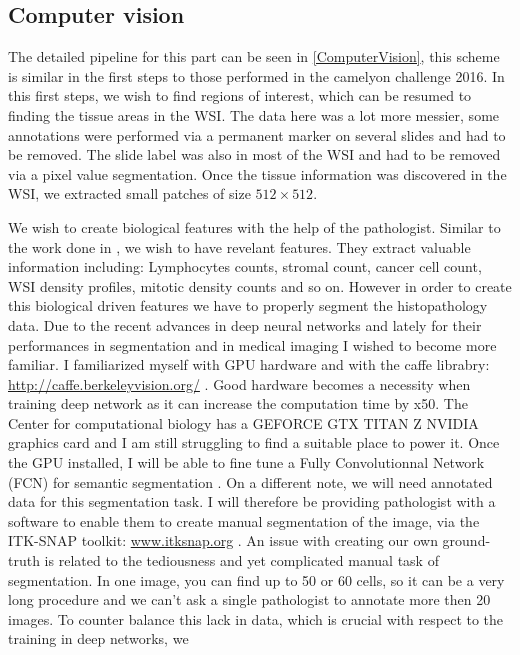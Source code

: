 \documentclass[a4paper,10pt]{article}
\begin{document}
\subsection{Computer vision}
The detailed pipeline for this part can be seen in
\ref{ComputerVision}, this scheme is similar in the first steps to
those performed in the camelyon challenge 2016. In this first steps,
we wish to find regions of interest, which can be resumed to finding
the tissue areas in the WSI. The data here was a lot more messier,
some annotations were performed via a permanent marker on several
slides and had to be removed. The slide label was also in most of the
WSI and had to be removed via a pixel value segmentation. Once the
tissue information was discovered in the WSI, we extracted small
patches of size $512 \times 512$. 

We wish to create biological features with the help of the
pathologist. Similar to the work done in \citet{yuan2012quantitative},
we wish to have revelant features. They extract valuable information
including: Lymphocytes counts, stromal count, cancer cell count, WSI
density profiles, mitotic density counts and so on. However in order
to create this biological driven features we have to properly segment
the histopathology data. Due to the recent advances in deep neural
networks and lately for their performances in segmentation and in
medical imaging \citep{UNet,long2015fcn} I wished to become more
familiar. I familiarized myself with GPU hardware and with the caffe
librabry: \url{http://caffe.berkeleyvision.org/}
\citep{jia2014caffe}. Good hardware becomes a necessity when training
deep network as it can increase the computation time by x50. The
Center for computational biology has a GEFORCE GTX TITAN Z NVIDIA
graphics card and I am still struggling to find a suitable place to
power it. 
Once the GPU installed, I will be able to fine tune a Fully
Convolutionnal Network (FCN) for semantic segmentation
\citep{long2015fcn}. On a different note, we will need annotated data
for this segmentation task. I will therefore be providing pathologist
with a software to enable them to create manual segmentation of the
image, via the ITK-SNAP toolkit: \url{www.itksnap.org}
\citep{py06nimg}. An issue with creating our own ground-truth is
related to the tediousness and yet complicated manual task of
segmentation. In one image, you can find up to 50 or 60 cells, so it
can be a very long procedure and we can't ask a single pathologist to
annotate more then 20 images. To counter balance this lack in data,
which is crucial with respect to the training in deep networks, we
\end{document}
